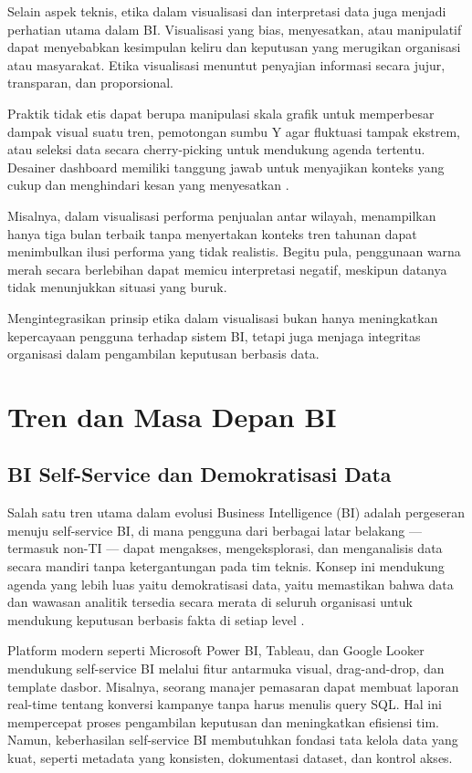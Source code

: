 Selain aspek teknis, etika dalam visualisasi dan interpretasi data juga menjadi perhatian utama dalam BI. Visualisasi yang bias, menyesatkan, atau manipulatif dapat menyebabkan kesimpulan keliru dan keputusan yang merugikan organisasi atau masyarakat. Etika visualisasi menuntut penyajian informasi secara jujur, transparan, dan proporsional.

Praktik tidak etis dapat berupa manipulasi skala grafik untuk memperbesar dampak visual suatu tren, pemotongan sumbu Y agar fluktuasi tampak ekstrem, atau seleksi data secara cherry-picking untuk mendukung agenda tertentu. Desainer dashboard memiliki tanggung jawab untuk menyajikan konteks yang cukup dan menghindari kesan yang menyesatkan \cite{borgo2018ethics}.

Misalnya, dalam visualisasi performa penjualan antar wilayah, menampilkan hanya tiga bulan terbaik tanpa menyertakan konteks tren tahunan dapat menimbulkan ilusi performa yang tidak realistis. Begitu pula, penggunaan warna merah secara berlebihan dapat memicu interpretasi negatif, meskipun datanya tidak menunjukkan situasi yang buruk.

Mengintegrasikan prinsip etika dalam visualisasi bukan hanya meningkatkan kepercayaan pengguna terhadap sistem BI, tetapi juga menjaga integritas organisasi dalam pengambilan keputusan berbasis data.



\section{Tren dan Masa Depan BI}
\subsection{BI Self-Service dan Demokratisasi Data}

Salah satu tren utama dalam evolusi Business Intelligence (BI) adalah pergeseran menuju self-service BI, di mana pengguna dari berbagai latar belakang — termasuk non-TI — dapat mengakses, mengeksplorasi, dan menganalisis data secara mandiri tanpa ketergantungan pada tim teknis. Konsep ini mendukung agenda yang lebih luas yaitu demokratisasi data, yaitu memastikan bahwa data dan wawasan analitik tersedia secara merata di seluruh organisasi untuk mendukung keputusan berbasis fakta di setiap level \cite{imhoff2014ssbi}.

Platform modern seperti Microsoft Power BI, Tableau, dan Google Looker mendukung self-service BI melalui fitur antarmuka visual, drag-and-drop, dan template dasbor. Misalnya, seorang manajer pemasaran dapat membuat laporan real-time tentang konversi kampanye tanpa harus menulis query SQL. Hal ini mempercepat proses pengambilan keputusan dan meningkatkan efisiensi tim. Namun, keberhasilan self-service BI membutuhkan fondasi tata kelola data yang kuat, seperti metadata yang konsisten, dokumentasi dataset, dan kontrol akses.

